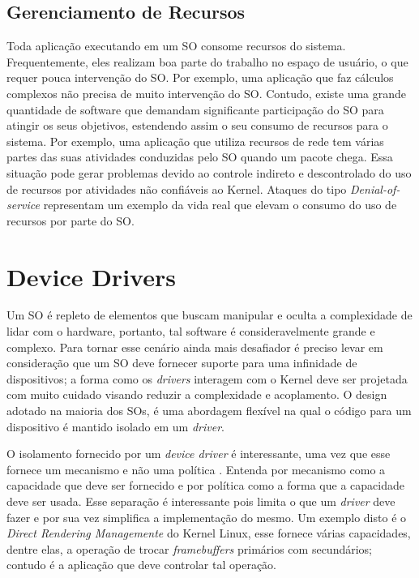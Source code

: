 \subsection{Gerenciamento de Recursos}

Toda aplicação executando em um SO consome recursos do sistema. Frequentemente,
eles realizam boa parte do trabalho no espaço de usuário, o que requer pouca
intervenção do SO. Por exemplo, uma aplicação que faz cálculos complexos não
precisa de muito intervenção do SO. Contudo, existe uma grande quantidade de
software que demandam significante participação do SO para atingir os seus
objetivos, estendendo assim o seu consumo de recursos para o sistema. Por
exemplo, uma aplicação que utiliza recursos de rede tem várias partes das suas
atividades conduzidas pelo SO quando um pacote chega. Essa situação pode gerar
problemas devido ao controle indireto e descontrolado do uso de recursos por
atividades não confiáveis ao Kernel. Ataques do tipo \emph{Denial-of-service}
representam um exemplo da vida real que elevam o consumo do uso de recursos por
parte do SO.



\section{Device Drivers}
\label{sec:dd}

Um SO é repleto de elementos que buscam manipular e oculta a complexidade de
lidar com o hardware, portanto, tal software é consideravelmente grande e
complexo. Para tornar esse cenário ainda mais desafiador é preciso levar em
consideração que um SO deve fornecer suporte para uma infinidade de
dispositivos; a forma como os \emph{drivers} interagem com o Kernel deve ser
projetada com muito cuidado visando reduzir a complexidade e acoplamento.  O
design adotado na maioria dos SOs, é uma abordagem flexível na qual o código
para um dispositivo é mantido isolado em um \emph{driver}.

O isolamento fornecido por um \emph{device driver} é interessante, uma vez que
esse fornece um mecanismo e não uma política \citep{ddbook}. Entenda por
mecanismo como a capacidade que deve ser fornecido e por política como a forma
que a capacidade deve ser usada. Esse separação é interessante pois limita o
que um \emph{driver} deve fazer e por sua vez simplifica a implementação do
mesmo. Um exemplo disto é o \emph{Direct Rendering Managemente} do Kernel
Linux, esse fornece várias capacidades, dentre elas, a operação de trocar
\emph{framebuffers} primários com secundários; contudo é a aplicação que deve
controlar tal operação.

